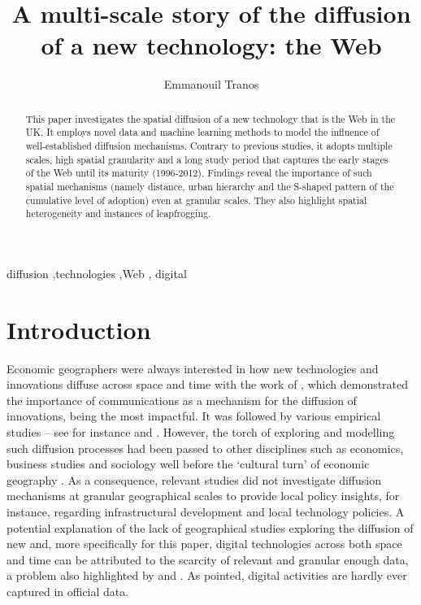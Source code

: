 \documentclass[
  authoryear,
  preprint,
  3p]{elsarticle}
\begin{document}
\begin{frontmatter}
\title{A multi-scale story of the diffusion of a new technology: the
Web}
\author[1]{Emmanouil Tranos%
%
}



        
\begin{abstract}
This paper investigates the spatial diffusion of a new technology that
is the Web in the UK. It employs novel data and machine learning methods
to model the influence of well-established diffusion mechanisms.
Contrary to previous studies, it adopts multiple scales, high spatial
granularity and a long study period that captures the early stages of
the Web until its maturity (1996-2012). Findings reveal the importance
of such spatial mechanisms (namely distance, urban hierarchy and the
S-shaped pattern of the cumulative level of adoption) even at granular
scales. They also highlight spatial heterogeneity and instances of
leapfrogging.
\end{abstract}





\begin{keyword}
    diffusion \sep technologies \sep Web \sep 
    digital
\end{keyword}
\end{frontmatter}
    

\section{Introduction}\label{sec-introduction}

Economic geographers were always interested in how new technologies and
innovations diffuse across space and time with the work of
\citet{hagerstrand1968innovation}, which demonstrated the importance of
communications as a mechanism for the diffusion of innovations, being
the most impactful. It was followed by various empirical studies -- see
for instance \citet{ormrod1990} and \citet{iso2005}. However, the torch
of exploring and modelling such diffusion processes had been passed to
other disciplines such as economics, business studies and sociology well
before the `cultural turn' of economic geography
\citep{perkins2005international, ding2010modeling}. As a consequence,
relevant studies did not investigate diffusion mechanisms at granular
geographical scales to provide local policy insights, for instance,
regarding infrastructural development and local technology policies. A
potential explanation of the lack of geographical studies exploring the
diffusion of new and, more specifically for this paper, digital
technologies across both space and time can be attributed to the
scarcity of relevant and granular enough data, a problem also
highlighted by \citet{iso2005} and \citet{kemeny2011international}. As
\citet{zook2022mapping} pointed, digital activities are hardly ever
captured in official data.
\end{document}
